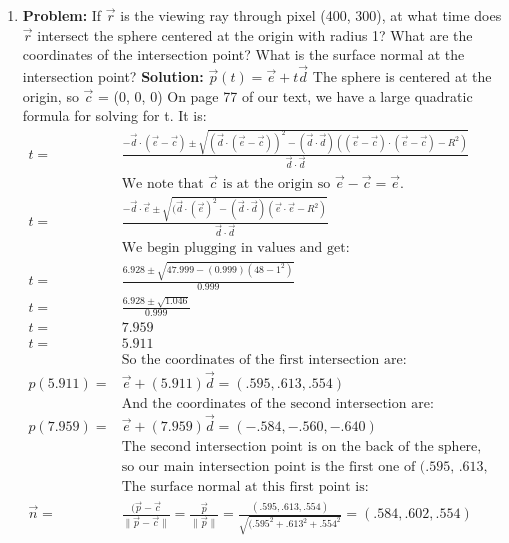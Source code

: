 \documentclass[a4paper, 12pt]{article}
\newcommand{\norm}[1]{\lVert#1\rVert}
\begin{document}
\begin{enumerate}
    \item \textbf{Problem:} If $\vec{r}$ is the viewing ray through pixel (400, 300), at what time does $\vec{r}$ intersect the sphere centered at the origin with radius 1? What are the coordinates of the intersection point?  What is the surface normal at the intersection point?
        \textbf{Solution:} $\vec{p}(t) = \vec{e} + t\vec{d}$ The sphere is centered at the origin, so $\vec{c}$ = (0, 0, 0) On page 77 of our text, we have a large quadratic formula for solving for t. It is:
        \begin{align*}
            t =& \frac{-\vec{d}\cdot(\vec{e}-\vec{c}) \pm \sqrt{(\vec{d}\cdot(\vec{e}-\vec{c}))^2 - (\vec{d}\cdot\vec{d})\left( (\vec{e}-\vec{c})\cdot(\vec{e}-\vec{c}) - R^2 \right)}}{\vec{d}\cdot\vec{d}}\\
            &\text{We note that $\vec{c}$ is at the origin so $\vec{e} - \vec{c} = \vec{e}$.}\\
            t =& \frac{-\vec{d}\cdot\vec{e} \pm \sqrt{(\vec{d}\cdot(\vec{e})^2 - (\vec{d}\cdot\vec{d})\left( \vec{e}\cdot\vec{e} - R^2 \right)}}{\vec{d}\cdot\vec{d}}\\
            &\text{We begin plugging in values and get:}\\
            t =& \frac{6.928 \pm \sqrt{47.999 - (0.999)\left( 48 - 1^2 \right)}}{0.999}\\
            t =& \frac{6.928 \pm \sqrt{1.046}}{0.999}\\
            t =& 7.959\\
            t =& 5.911\\
            &\text{So the coordinates of the first intersection are:}\\
            p(5.911) =& \vec{e} + (5.911)\vec{d} = (.595, .613, .554)\\
            &\text{And the coordinates of the second intersection are:}\\
            p(7.959) =& \vec{e} + (7.959)\vec{d} = (-.584, -.560, -.640)\\
            &\text{The second intersection point is on the back of the sphere,}\\
            &\text{so our main intersection point is the first one of (.595, .613, .554)}\\
            &\text{The surface normal at this first point is:}\\
            \vec{n} =& \frac{(\vec{p} - \vec{c}}{\norm{\vec{p} - \vec{c}}} = \frac{\vec{p}}{\norm{\vec{p}}} = \frac{(.595, .613, .554)}{\sqrt{(.595^2 + .613^2 + .554^2}} = (.584, .602, .554)\\
        \end{align*}


\end{enumerate}
\end{document}
